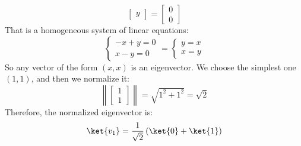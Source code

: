 \begin{itemize}
\begin{itemize}
\begin{equation*}
\begin{bmatrix}
                y
            \end{bmatrix}
            =
            \begin{bmatrix}
                0 \\
                0
            \end{bmatrix}
        \end{equation*}
        That is a homogeneous system of linear equations:
        \begin{equation*}
            \begin{cases}
                -x + y = 0 \\
                x - y = 0
            \end{cases}
            =
            \begin{cases}
                y = x \\
                x = y
            \end{cases}
        \end{equation*}
        So any vector of the form $\left(x, x\right)$ is an eigenvector. We choose the simplest one $\left(1, 1\right)$, and then we normalize it:
        \begin{equation*}
            \left\| \begin{bmatrix}
                1 \\
                1
            \end{bmatrix} \right\| = \sqrt{1^2 + 1^2} = \sqrt{2}
        \end{equation*}
        Therefore, the normalized eigenvector is:
        \begin{equation*}
            \ket{v_1} = \frac{1}{\sqrt{2}}\left(\ket{0} + \ket{1}\right)
        \end{equation*}


\end{itemize}
\end{itemize}
